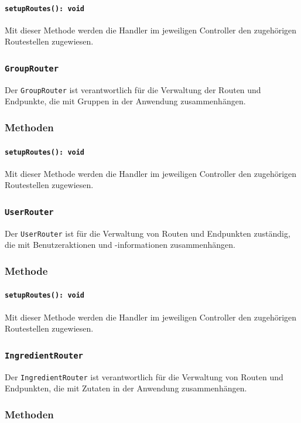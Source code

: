 \documentclass{entwurfsheft}
\begin{document}
\paragraph{\texttt{setupRoutes(): void}}
Mit dieser Methode werden die Handler im jeweiligen Controller den zugehörigen Routestellen zugewiesen.

\subsubsection{\texttt{GroupRouter}}\label{sec:GroupRouter}
Der \texttt{GroupRouter} ist verantwortlich für die Verwaltung der Routen und Endpunkte, die mit Gruppen in der Anwendung zusammenhängen.
\subsubsection*{Methoden}
\paragraph{\texttt{setupRoutes(): void}}
Mit dieser Methode werden die Handler im jeweiligen Controller den zugehörigen Routestellen zugewiesen.

\subsubsection{\texttt{UserRouter}}\label{sec:UserRouter}
Der \texttt{UserRouter} ist für die Verwaltung von Routen und Endpunkten zuständig, die mit Benutzeraktionen und -informationen zusammenhängen.
\subsubsection*{Methode}
\paragraph{\texttt{setupRoutes(): void}}
Mit dieser Methode werden die Handler im jeweiligen Controller den zugehörigen Routestellen zugewiesen.

\subsubsection{\texttt{IngredientRouter}}\label{sec:IngredientRouter}
Der \texttt{IngredientRouter} ist verantwortlich für die Verwaltung von Routen und Endpunkten, die mit Zutaten in der Anwendung zusammenhängen.
\subsubsection*{Methoden}
\end{document}
